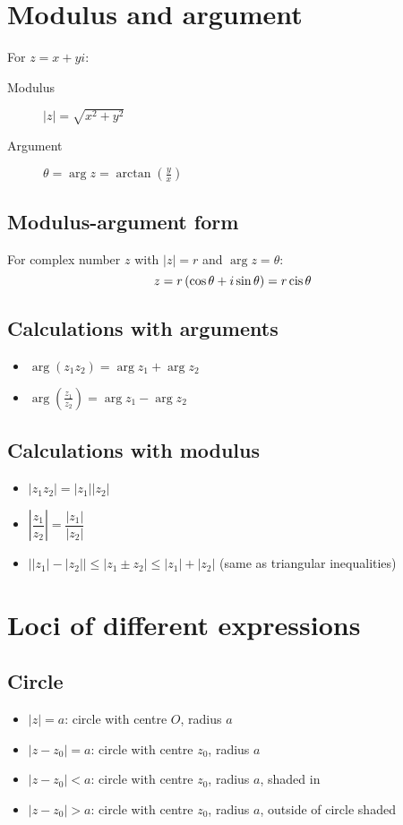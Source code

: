 \section{Modulus and argument}
For $z=x+yi$:
\begin{description}
    \item[Modulus] $|z| = \sqrt{x^2+y^2}$
    \item[Argument] $\theta = \arg z = \arctan\left(\frac{y}{x}\right)$
\end{description}

\subsection{Modulus-argument form}
For complex number $z$ with $|z|=r$ and $\arg z = \theta$:
$$z=r\left(\cos\theta + i\sin\theta\right)=r\operatorname{cis}\theta$$

\subsection{Calculations with arguments}
\begin{itemize}
    \item $\arg\left(z_1z_2\right)=\arg z_1 +\arg z_2$
    \item $\arg\left(\frac{z_1}{z_2}\right)=\arg z_1-\arg z_2$
\end{itemize}

\subsection{Calculations with modulus}
\begin{itemize}
    \item $|z_1z_2|=|z_1||z_2|$
    \item $\left|\dfrac{z_1}{z_2}\right|=\dfrac{|z_1|}{|z_2|}$
    \item $\left||z_1|-|z_2|\right| \leq |z_1 \pm z_2| \leq |z_1|+|z_2|$ (same as triangular inequalities)
\end{itemize}

\section{Loci of different expressions}
\subsection{Circle}
\begin{itemize}
    \item $|z| = a$: circle with centre $O$, radius $a$
    \item $|z-z_0|=a$: circle with centre $z_0$, radius $a$
    \item $|z-z_0|<a$: circle with centre $z_0$, radius $a$, shaded in
    \item $|z-z_0|>a$: circle with centre $z_0$, radius $a$, outside of circle shaded
\end{itemize}
